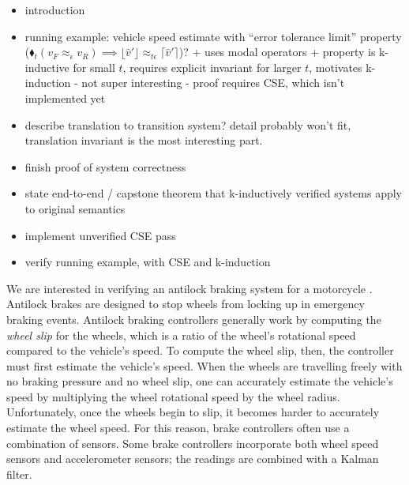 \documentclass[sigplan,screen]{acmart}
\begin{document}
\begin{itemize}
  \item introduction
  \item running example: vehicle speed estimate with ``error tolerance limit'' property ($\blacklozenge_{t} (v_F \approx_{\epsilon} v_R) \implies \lfloor \hat{v}' \rfloor \approx_{t\epsilon} \lceil \hat{v}' \rceil$)?
    + uses modal operators
    + property is k-inductive for small $t$, requires explicit invariant for larger $t$, motivates k-induction
    - not super interesting
    - proof requires CSE, which isn't implemented yet
  \item describe translation to transition system? detail probably won't fit, translation invariant is the most interesting part.
\end{itemize}
\begin{itemize}
  \item finish proof of system correctness
  \item state end-to-end / capstone theorem that k-inductively verified systems apply to original semantics
  \item implement unverified CSE pass
  \item verify running example, with CSE and k-induction
\end{itemize}

We are interested in verifying an antilock braking system for a motorcycle \cite{huang2010design}.
Antilock brakes are designed to stop wheels from locking up in emergency braking events.
Antilock braking controllers generally work by computing the \emph{wheel slip} for the wheels, which is a ratio of the wheel's rotational speed compared to the vehicle's speed.
To compute the wheel slip, then, the controller must first estimate the vehicle's speed.
When the wheels are travelling freely with no braking pressure and no wheel slip, one can accurately estimate the vehicle's speed by multiplying the wheel rotational speed by the wheel radius.
Unfortunately, once the wheels begin to slip, it becomes harder to accurately estimate the wheel speed.
For this reason, brake controllers often use a combination of sensors.
Some brake controllers \cite{kobayashi1995estimation} incorporate both wheel speed sensors and accelerometer sensors; the readings are combined with a Kalman filter.
\end{document}
